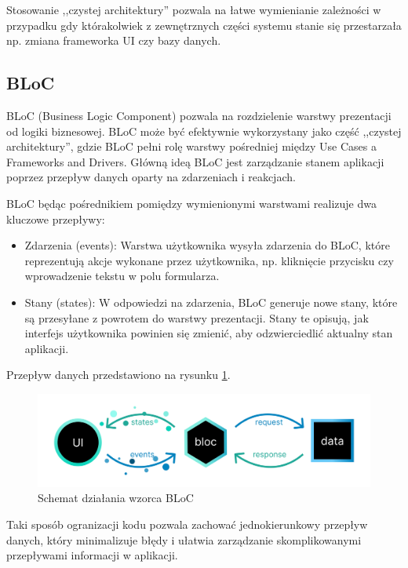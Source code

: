 Stosowanie ,,czystej architektury'' pozwala na łatwe wymienianie zależności w przypadku gdy którakolwiek z zewnętrznych części systemu stanie się przestarzała np. zmiana frameworka UI czy bazy danych.


\subsection{BLoC}
BLoC (Business Logic Component) pozwala na rozdzielenie warstwy prezentacji od logiki biznesowej.
BLoC może być efektywnie wykorzystany jako część ,,czystej architektury'', gdzie BLoC pełni rolę warstwy pośredniej między Use Cases a Frameworks and Drivers. 
Główną ideą BLoC jest zarządzanie stanem aplikacji poprzez przepływ danych oparty na zdarzeniach i reakcjach.

BLoC będąc pośrednikiem pomiędzy wymienionymi warstwami realizuje dwa kluczowe przepływy:
\begin{itemize}
    \item Zdarzenia (events): Warstwa użytkownika wysyła zdarzenia do BLoC, które reprezentują akcje wykonane przez użytkownika, np. kliknięcie przycisku czy wprowadzenie tekstu w polu formularza.
    \item Stany (states): W odpowiedzi na zdarzenia, BLoC generuje nowe stany, które są przesyłane z powrotem do warstwy prezentacji. Stany te opisują, jak interfejs użytkownika powinien się zmienić, aby odzwierciedlić aktualny stan aplikacji.
\end{itemize}
Przepływ danych przedstawiono na rysunku \ref{fig:bloc_diagram}.
\begin{figure}[H]
    \centering
    \includegraphics[width=0.9\linewidth]{figs/bloc.png}
    \caption{Schemat działania wzorca BLoC}
    \label{fig:bloc_diagram}
\end{figure}
Taki sposób ogranizacji kodu pozwala zachować jednokierunkowy przepływ danych, który minimalizuje błędy i ułatwia zarządzanie skomplikowanymi przepływami informacji w aplikacji.

